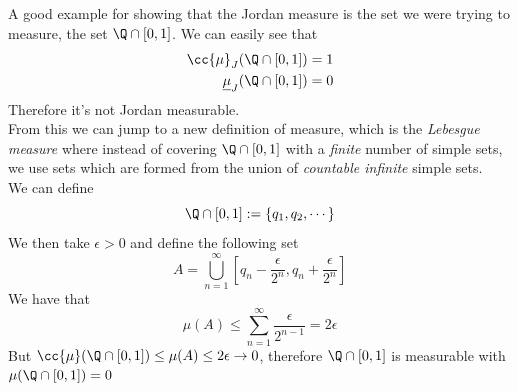 \documentclass[../mmf.tex]{subfiles}
\begin{document}
\begin{rmk}
	A good example for showing that the Jordan measure is the set we were trying to measure, the set $\Q\cap[0,1]$. We can easily see that
	\begin{equation*}
		\begin{aligned}
			\cc{\mu}_J(\Q\cap[0,1])&=1\\
			\underline{\mu}_J(\Q\cap[0,1])&=0
		\end{aligned}
	\end{equation*}
	Therefore it's not Jordan measurable.\\
	From this we can jump to a new definition of measure, which is the \textit{Lebesgue measure} where instead of covering $\Q\cap[0,1]$ with a \textit{finite} number of simple sets, we use sets which are formed from the union of \textit{countable infinite} simple sets.\\
	We can define
	\begin{equation*}
		\Q\cap[0,1]:=\{q_1,q_2,\cdots\}
	\end{equation*}
	We then take $\epsilon>0$ and define the following set
	\begin{equation*}
		A=\bigcup_{n=1}^\infty\left[ q_n-\frac{\epsilon}{2^n},q_n+\frac{\epsilon}{2^n} \right]
	\end{equation*}
	We have that
	\begin{equation*}
		\mu(A)\le\sum_{n=1}^\infty\frac{\epsilon}{2^{n-1}}=2\epsilon
	\end{equation*}
	But $\cc{\mu}(\Q\cap[0,1])\le\mu(A)\le2\epsilon\to0$, therefore $\Q\cap[0,1]$ is measurable with $\mu(\Q\cap[0,1])=0$
\end{rmk}
\end{document}
